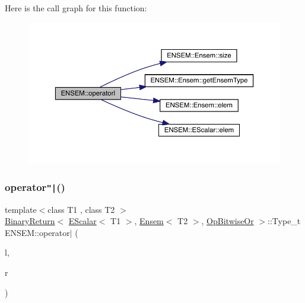 Here is the call graph for this function\+:\nopagebreak
\begin{figure}[H]
\begin{center}
\leavevmode
\includegraphics[width=350pt]{d1/d9e/group__eensem_gadd9d57d20a2060d811fba3899bcfcd73_cgraph}
\end{center}
\end{figure}
\mbox{\label{group__eensem_gacc25f74aa29769c6afffde4164c7821c}} 
\subsubsection{\texorpdfstring{operator\texttt{"|}()}{operator|()}\hspace{0.1cm}{\footnotesize\ttfamily [3/3]}}
{\footnotesize\ttfamily template$<$class T1 , class T2 $>$ \\
\mbox{\hyperlink{structENSEM_1_1BinaryReturn}{Binary\+Return}}$<$ \mbox{\hyperlink{classENSEM_1_1EScalar}{E\+Scalar}}$<$ T1 $>$, \mbox{\hyperlink{classENSEM_1_1Ensem}{Ensem}}$<$ T2 $>$, \mbox{\hyperlink{structENSEM_1_1OpBitwiseOr}{Op\+Bitwise\+Or}} $>$\+::Type\+\_\+t E\+N\+S\+E\+M\+::operator$\vert$ (\begin{DoxyParamCaption}\item[{const \mbox{\hyperlink{classENSEM_1_1EScalar}{E\+Scalar}}$<$ T1 $>$ \&}]{l,  }\item[{const \mbox{\hyperlink{classENSEM_1_1Ensem}{Ensem}}$<$ T2 $>$ \&}]{r }\end{DoxyParamCaption})\hspace{0.3cm}{\ttfamily [inline]}}

